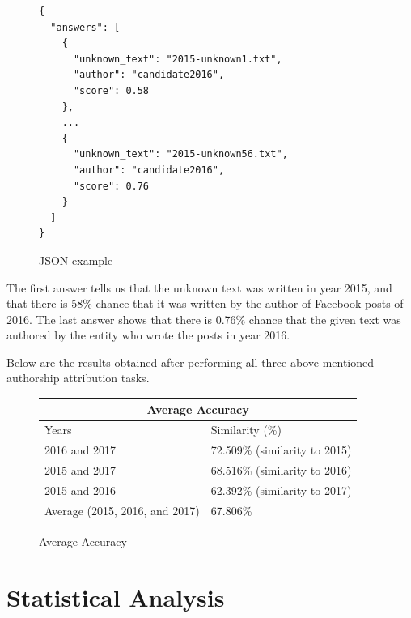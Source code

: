 \documentclass[12pt]{article}
\theoremstyle{definition}
\begin{document}
\begin{figure}[H]
\begin{verbatim}
{
  "answers": [
    {
      "unknown_text": "2015-unknown1.txt",
      "author": "candidate2016",
      "score": 0.58
    },
    ...
    {
      "unknown_text": "2015-unknown56.txt",
      "author": "candidate2016",
      "score": 0.76
    }
  ]
}
\end{verbatim}
\caption*{JSON example}
\end{figure}

The first answer tells us that the unknown text was written in year 2015, and
that there is 58\% chance that it was written by the author of Facebook posts
of 2016. The last answer shows that there is 0.76\% chance that the given
text was authored by the entity who wrote the posts in year 2016.

\bigskip

Below are the results obtained after performing all three above-mentioned
authorship attribution tasks.

\begin{figure}[H]
\centering
\begin{tabular}{|p{8cm}|p{8cm}|}
 \hline
 \multicolumn{2}{|c|}{Average Accuracy}\\
 \hline
 Years & Similarity (\%)\\
 \hline
 2016 and 2017 & 72.509\% (similarity to 2015)\\
 \hline
 2015 and 2017 & 68.516\% (similarity to 2016)\\
 \hline
 2015 and 2016 & 62.392\% (similarity to 2017)\\
 \hline
 Average (2015, 2016, and 2017) & 67.806\%\\
 \hline
\end{tabular}
\caption*{Average Accuracy}
\end{figure}

\bigskip


\section*{\centering Statistical Analysis}

\end{document}
